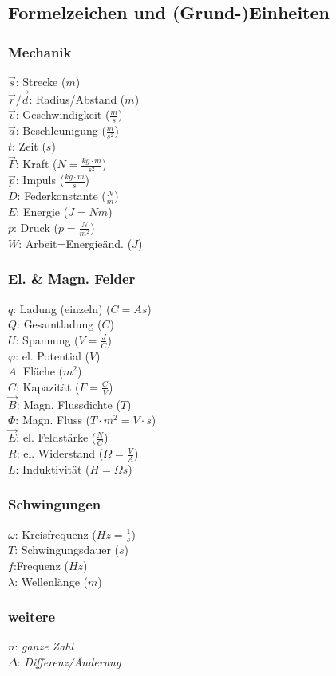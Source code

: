\documentclass[12pt,a4paper,oneside]{article}
\begin{document}
\subsection*{Formelzeichen und (Grund-)Einheiten}
\begin{multicols}{3}
 \subsubsection*{Mechanik}
 $\vec{s}$: Strecke ($m$) \\
 $\vec{r}/\vec{d}$: Radius/Abstand ($m$)\\
 $\vec{v}$: Geschwindigkeit ($\frac{m}{s}$) \\
 $\vec{a}$: Beschleunigung ($\frac{m}{s^2}$) \\
 $t$: Zeit ($s$) \\
 $\vec{F}$: Kraft ($N=\frac{kg \cdot m}{s^2}$) \\
 $\vec{p}$: Impuls ($\frac{kg \cdot m}{s}$) \\
 $D$: Federkonstante ($\frac{N}{m}$) \\
 $E$: Energie ($J=Nm$) \\
 $p$: Druck ($p=\frac{N}{m^2}$) \\
 $W$: Arbeit=Energieänd. ($J$)
 \subsubsection*{El. \& Magn. Felder}
 $q$: Ladung (einzeln) ($C=As$) \\
 $Q$: Gesamtladung ($C$) \\
 $U$: Spannung ($V=\frac{J}{C}$) \\
 $\varphi$: el. Potential ($V$) \\
 $A$: Fläche ($m^2$) \\
 $C$: Kapazität ($F=\frac{C}{V}$) \\
 $\vec{B}$: Magn. Flussdichte ($T$) \\
 $\Phi$: Magn. Fluss ($T \cdot m^2 = V \cdot s $) \\
 $\vec{E}$: el. Feldstärke ($\frac{N}{C}$) \\
 $R$: el. Widerstand ($\Omega=\frac{V}{A}$) \\
 $L$: Induktivität ($H = \Omega s$) \\
 \subsubsection*{Schwingungen}
 $\omega$: Kreisfrequenz ($Hz = \frac{1}{s}$) \\
 $T$: Schwingungsdauer ($s$) \\
 $f$:Frequenz ($Hz$) \\
 $\lambda$: Wellenlänge ($m$) \\
 \subsubsection*{weitere}
 $n$: \textit{ganze Zahl}\\
 $\Delta$: \textit{Differenz/Änderung}\\
\end{multicols}
\end{document}
